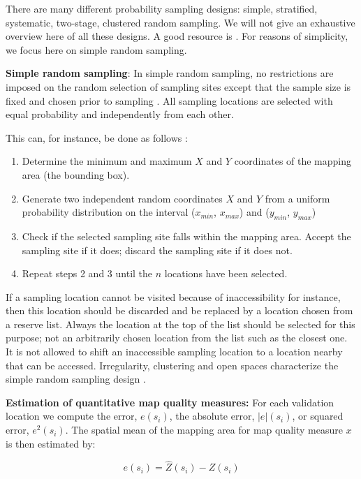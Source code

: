 \documentclass[10pt,b5paper,]{book}
\theoremstyle{definition}
\theoremstyle{definition}
\theoremstyle{definition}
\theoremstyle{remark}
\begin{document}
There are many different probability sampling designs: simple,
stratified, systematic, two-stage, clustered random sampling. We will
not give an exhaustive overview here of all these designs. A good
resource is \citet{de2006sampling}. For reasons of simplicity, we focus
here on simple random sampling.

\textbf{Simple random sampling}: In simple random sampling, no
restrictions are imposed on the random selection of sampling sites
except that the sample size is fixed and chosen prior to sampling
\citep{de2006sampling}. All sampling locations are selected with equal
probability and independently from each other.

This can, for instance, be done as follows \citep{de2006sampling}:

\begin{enumerate}
\def\labelenumi{\arabic{enumi}.}
\item
  Determine the minimum and maximum \(X\) and \(Y\) coordinates of the
  mapping area (the bounding box).
\item
  Generate two independent random coordinates \(X\) and \(Y\) from a
  uniform probability distribution on the interval (\(x_{min}\),
  \(x_{max}\)) and (\(y_{min}\), \(y_{max}\))
\item
  Check if the selected sampling site falls within the mapping area.
  Accept the sampling site if it does; discard the sampling site if it
  does not.
\item
  Repeat steps 2 and 3 until the \(n\) locations have been selected.
\end{enumerate}

If a sampling location cannot be visited because of inaccessibility for
instance, then this location should be discarded and be replaced by a
location chosen from a reserve list. Always the location at the top of
the list should be selected for this purpose; not an arbitrarily chosen
location from the list such as the closest one. It is not allowed to
shift an inaccessible sampling location to a location nearby that can be
accessed. Irregularity, clustering and open spaces characterize the
simple random sampling design \citep{de2006sampling}.

\textbf{Estimation of quantitative map quality measures:} For each
validation location we compute the error, \(e(s_i)\), the absolute
error, \(|e|(s_i)\), or squared error, \(e^2(s_i)\). The spatial mean of
the mapping area for map quality measure \(x\) is then estimated by:

\begin{equation}
e(s_i) = \hat{Z}(s_i) - Z(s_i)
\end{equation}
\end{document}
